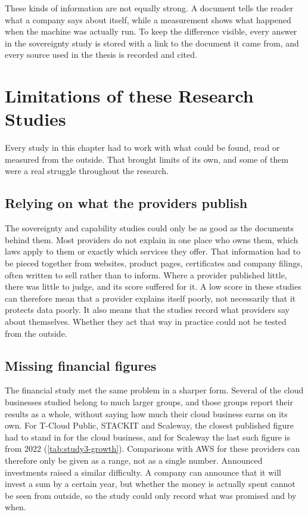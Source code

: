 These kinds of information are not equally strong. A document tells the reader what
a company says about itself, while a measurement shows what happened when the
machine was actually run. To keep the difference visible, every answer in the
sovereignty study is stored with a link to the document it came from, and every
source used in the thesis is recorded and cited.









\section{Limitations of these Research Studies}
\label{sec:design-limitations}

Every study in this chapter had to work with what could be found, read or measured
from the outside. That brought limits of its own, and some of them were a real
struggle throughout the research.

\subsection*{Relying on what the providers publish}

The sovereignty and capability studies could only be as good as the documents
behind them. Most providers do not explain in one place who owns them, which laws
apply to them or exactly which services they offer. That information had to be
pieced together from websites, product pages, certificates and company filings,
often written to sell rather than to inform. Where a provider published little,
there was little to judge, and its score suffered for it. A low score in these
studies can therefore mean that a provider explains itself poorly, not necessarily
that it protects data poorly. It also means that the studies record what providers
say about themselves. Whether they act that way in practice could not be tested from
the outside.

\subsection*{Missing financial figures}

The financial study met the same problem in a sharper form. Several of the cloud
businesses studied belong to much larger groups, and those groups report their
results as a whole, without saying how much their cloud business earns on its own.
For T-Cloud Public, STACKIT and Scaleway, the closest published figure had to stand
in for the cloud business, and for Scaleway the last such figure is from 2022
(\cref{tab:study3-growth}). Comparisons with \acs{AWS} for these providers can
therefore only be given as a range, not as a single number. Announced investments
raised a similar difficulty. A company can announce that it will invest a sum by a
certain year, but whether the money is actually spent cannot be seen from outside,
so the study could only record what was promised and by when.

